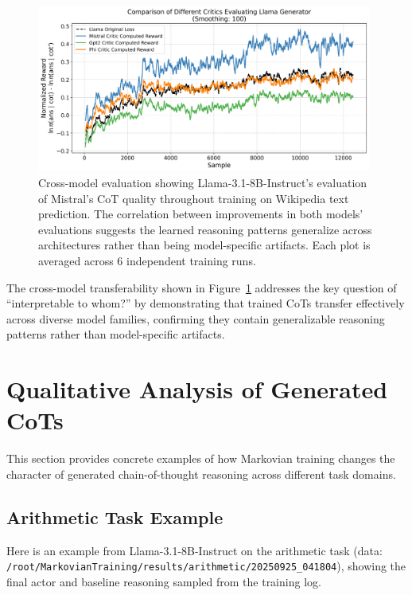 \documentclass{article} %
\begin{document}
\begin{figure}[ht]
    \centering
    \includegraphics[width=0.98\textwidth]{Figures/wiki_multi_critic_comparison.png}
    \caption{Cross-model evaluation showing Llama-3.1-8B-Instruct's evaluation of Mistral's CoT quality throughout training on Wikipedia text prediction. The correlation between improvements in both models' evaluations suggests the learned reasoning patterns generalize across architectures rather than being model-specific artifacts. Each plot is averaged across 6 independent training runs.}
    \label{fig:wiki_cross_model}
\end{figure}

The cross-model transferability shown in Figure~\ref{fig:wiki_cross_model} addresses the key question of ``interpretable to whom?'' by demonstrating that trained CoTs transfer effectively across diverse model families, confirming they contain generalizable reasoning patterns rather than model-specific artifacts.

\section{Qualitative Analysis of Generated CoTs}
This section provides concrete examples of how Markovian training changes the character of generated chain-of-thought reasoning across different task domains.

\subsection{Arithmetic Task Example}
Here is an example from Llama-3.1-8B-Instruct on the arithmetic task (data: \texttt{/root/MarkovianTraining/results/arithmetic/20250925\_041804}), showing the final actor and baseline reasoning sampled from the training log.
\end{document}
